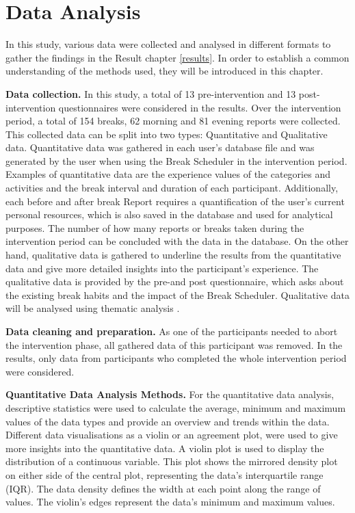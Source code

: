 \documentclass{hasel_thesis}
\begin{document}
 
\section{Data Analysis}
In this study, various data were collected and analysed in different formats to gather the findings in the Result chapter \ref{results}. In order to establish a common understanding of the methods used, they will be introduced in this chapter.

\textbf{Data collection.} In this study, a total of 13 pre-intervention and 13 post-intervention questionnaires were considered in the results. Over the intervention period, a total of 154 breaks, 62 morning and 81 evening reports were collected. This collected  data can be split into two types: Quantitative and Qualitative data. Quantitative data was gathered in each user's database file and was generated by the user when using the Break Scheduler in the intervention period. Examples of quantitative data are the experience values of the categories and activities and the break interval and duration of each participant. Additionally, each before and after break Report requires a quantification of the user's current personal resources, which is also saved in the database and used for analytical purposes. The number of how many reports or breaks taken during the intervention period can be concluded with the data in the database. On the other hand, qualitative data is gathered to underline the results from the quantitative data and give more detailed insights into the participant's experience. The qualitative data is provided by the pre-and post questionnaire, which asks about the existing break habits and the impact of the Break Scheduler. Qualitative data will be analysed using thematic analysis \cite{Braun.2006}. 

\textbf{Data cleaning and preparation.} As one of the participants needed to abort the intervention phase, all gathered data of this participant was removed. In the results, only data from participants who completed the whole intervention period were considered.

\textbf{Quantitative Data Analysis Methods.} For the quantitative data analysis, descriptive statistics were used to calculate the average, minimum and maximum values of the data types and provide an overview and trends within the data. Different data visualisations as a violin or an agreement plot, were used to give more insights into the quantitative data. A violin plot is used to display the distribution of a continuous variable. This plot shows the mirrored density plot on either side of the central plot, representing the data's interquartile range (IQR). The data density defines the width at each point along the range of values. The violin's edges represent the data's minimum and maximum values. 
\end{document}
